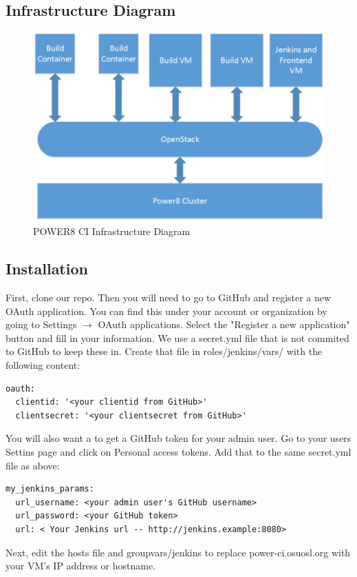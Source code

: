 \documentclass[10pt,letterpaper,onecolumn,draftclsnofoot]{IEEEtran}
\begin{document}
\subsection{Infrastructure Diagram}
\begin{figure}[H]
  \includegraphics[width=\textwidth]{images/infrastructure_diagram.eps}
  \caption{POWER8 CI Infrastructure Diagram}
\end{figure}
\subsection{Installation}

First, clone our repo. Then you will need to go to GitHub and register a new OAuth application.
You can find this under your account or organization by going to Settings $\rightarrow$ OAuth applications.
Select the "Register a new application" button and fill in your information.
We use a secret.yml file that is not commited to GitHub to keep these in.
Create that file in roles/jenkins/vars/ with the following content:

\begin{verbatim}
oauth:
  clientid: '<your clientid from GitHub>'
  clientsecret: '<your clientsecret from GitHub>'
\end{verbatim}
You will also want a to get a GitHub token for your admin user.
Go to your users Settins page and click on Personal access tokens.
Add that to the same secret.yml file as above:

\begin{verbatim}
my_jenkins_params:
  url_username: <your admin user's GitHub username>
  url_password: <your GitHub token>
  url: < Your Jenkins url -- http://jenkins.example:8080>
\end{verbatim}
Next, edit the hosts file and group\textunderscore vars/jenkins to replace power-ci.osuosl.org with your VM's IP address or hostname.
\end{document}
